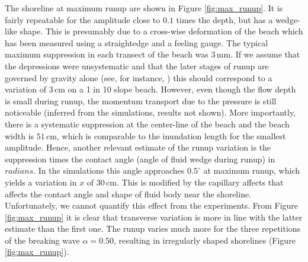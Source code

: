 \documentclass[review, authoryear]{elsarticle}
\newcommand{\cm}{\,\mbox{cm}}
\newcommand{\mm}{\,\mbox{mm}}
\begin{document}
The shoreline at maximum runup are shown in Figure \ref{fig:max_runup}. It is fairly repeatable for the amplitude close to $0.1$ times the 
depth, but has a wedge-like shape. 
 This is presumably due to a cross-wise deformation  of the beach 
which has been measured using a straightedge and a feeling gauge. 
The typical maximum suppression in each transect of the beach was $3\mm$. If we assume that the depressions were unsystematic and that the later
stages of runup are governed by gravity alone (see, for instance, \cite{jensen2003experimental}) this should correspond to a variation
 of $3\cm$ on a 1 in 10 slope beach. However, even though the
flow depth is small during runup, the momentum transport due to
 the pressure is still noticeable (inferred from the simulations, results not shown). More importantly, there is a systematic suppression at the center-line of the beach and the beach width is $51\cm$, which is comparable to the inundation length for the smallest amplitude. 
Hence, another relevant estimate of the runup variation is the suppression times the contact angle (angle of fluid wedge during runup) in $radians$. In the simulations this angle approaches $0.5^\circ$ at maximum runup, which yields a variation in $x$ of $30\cm$. This is modified by 
the capillary affects that affects the contact angle and 
shape of fluid body near the shoreline. Unfortunately, we cannot
quantify this effect from the experiments.  
From Figure 
\ref{fig:max_runup} it is clear that transverse variation is more in line with the latter estimate than the first one. The runup varies much more for the three repetitions of the breaking wave $\alpha=0.50$,
resulting in irregularly shaped shorelines  (Figure \ref{fig:max_runup}).
\end{document}
